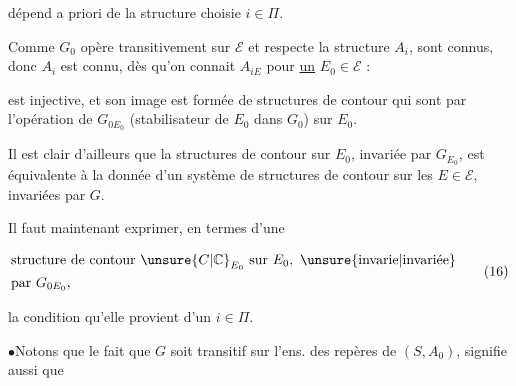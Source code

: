 dépend a priori de la  structure choisie $i\in\Pi$.

 Comme $G_0$ opère transitivement sur
$\mathcal E$ et respecte la structure $A_i$,  sont connus,
donc $A_i$ est connu, dès qu'on connait
$A_{iE}$ pour \uline{un} $E_0\in\mathcal E$ :


est injective, et son image est formée
de structures de contour qui sont
 par l'opération de $G_{0E_0}$ (stabilisateur
de $E_0$ dans $G_0$) sur $E_0$.

Il est clair d'ailleurs que la  structures
de contour sur $E_0$, invariée par $G_{E_0}$, est équivalente
à la donnée d'un système  de structures
de contour sur les $E\in\mathcal E$, invariées par $G$.

Il faut maintenant exprimer, en termes
 d'une

\[
 \begin{aligned}
 &\text{structure de contour }\unsure{C|{\mathbb C}}_{E_0}\text{ sur }E_0,\text{ \unsure{invarie|invariée}}\\
 &\text{par }G_{0E_0},
 \end{aligned} \tag*{(16)}
\]

la condition qu'elle provient d'un $i\in\Pi$.


$\bullet$\quad Notons que le fait que $G$ soit transitif sur l'ens. des repères de $(S,A_0)$, signifie aussi que

